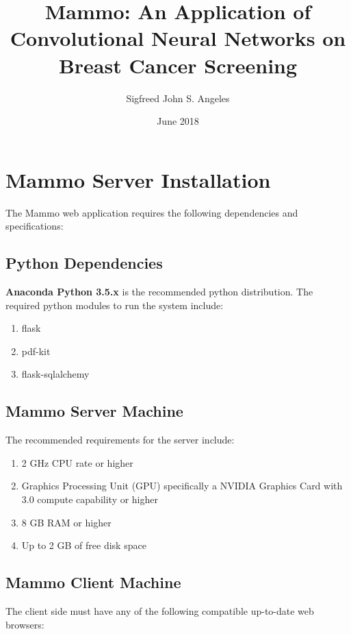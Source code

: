 \documentclass[11pt,a4paper,titlepage]{article}
\title {Mammo: An Application of Convolutional Neural Networks on Breast Cancer Screening}
\author {Sigfreed John S. Angeles}
\date{June 2018}
\let\stdsection\section
\renewcommand\section{\newpage\stdsection}
\newcommand{\+}{\discretionary{\mbox{${\bm\cdot}\mkern-1mu$}}{}{}}
\begin{document}


\doublespacing

\setcounter{page}{3}
\setcounter{tocdepth}{3}
\newpage

\doublespacing

\section{Mammo Server Installation}
\qquad The Mammo web application requires the following dependencies and specifications:

	\subsection{Python Dependencies}
	\hspace{5mm}\textbf{Anaconda Python 3.5.x} is the recommended python distribution. The required python modules to run the system include:
	
			\begin{enumerate}
				\item{flask}
				\item{pdf-kit}
				\item{flask-sqlalchemy}
			\end{enumerate}
	
	\subsection{Mammo Server Machine}
	\hspace{5mm} The recommended requirements for the server include:
			
			\begin{enumerate}
				\item{2 GHz CPU rate or higher}
				\item{Graphics Processing Unit (GPU) specifically a NVIDIA Graphics Card with 3.0 compute capability or higher}
				\item{8 GB RAM or higher}
				\item{Up to 2 GB of free disk space}
			\end{enumerate}

	\subsection{Mammo Client Machine}
	\hspace{5mm} The client side must have any of the following compatible up-to-date web browsers:
	
\end{document}
